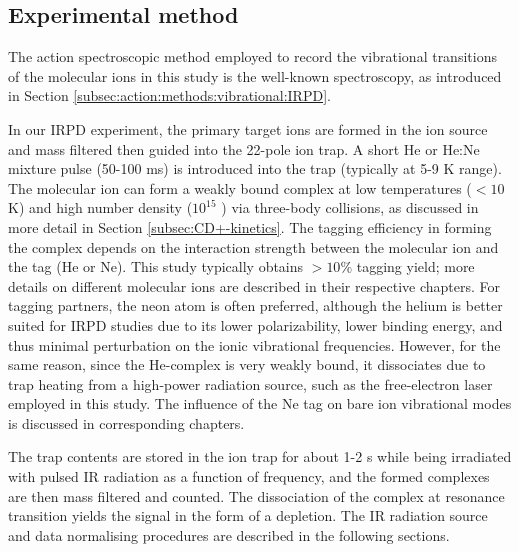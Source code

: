 \subsection{Experimental method}
\label{subsec:IRPD}

The action spectroscopic method employed to record the vibrational transitions of the molecular ions in this study is the well-known  spectroscopy, as introduced in Section \ref{subsec:action:methods:vibrational:IRPD}.

In our IRPD experiment, the primary target ions are formed in the ion source and mass filtered then guided into the 22-pole ion trap. A short He or He:Ne mixture pulse (50-100 ms) is introduced into the trap (typically at 5-9 K range). The molecular ion can form a weakly bound complex at low temperatures ($< 10$ K) and high number density ($10^{15}$ \percc ) via three-body collisions, as discussed in more detail in Section \ref{subsec:CD+-kinetics}. The tagging efficiency in forming the complex depends on the interaction strength between the molecular ion and the tag (He or Ne). This study typically obtains $> 10 \%$ tagging yield; more details on different molecular ions are described in their respective chapters. For tagging partners, the neon atom is often preferred, although the helium is better suited for IRPD studies due to its lower polarizability, lower binding energy, and thus  minimal perturbation on the ionic vibrational frequencies. However, for the same reason, since the He-complex is very weakly bound, it dissociates due to trap heating from a high-power radiation source, such as the free-electron laser employed in this study. The influence of the Ne tag on bare ion vibrational modes is discussed in corresponding chapters.

The trap contents are stored in the ion trap for about 1-2 s while being irradiated with pulsed IR radiation as a function of frequency, and the formed complexes are then mass filtered and counted. The dissociation of the complex at resonance transition yields the signal in the form of a depletion. The IR radiation source and data normalising procedures are described in the following sections.
